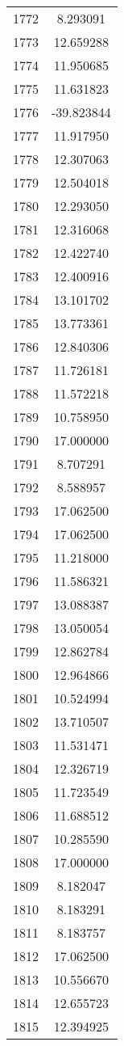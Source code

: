 \documentclass[12pt]{article}
\begin{document}
\begin{longtable}{@{}cc@{}}
1772 & 8.293091 \\
1773 & 12.659288 \\
1774 & 11.950685 \\
1775 & 11.631823 \\
1776 & -39.823844 \\
1777 & 11.917950 \\
1778 & 12.307063 \\
1779 & 12.504018 \\
1780 & 12.293050 \\
1781 & 12.316068 \\
1782 & 12.422740 \\
1783 & 12.400916 \\
1784 & 13.101702 \\
1785 & 13.773361 \\
1786 & 12.840306 \\
1787 & 11.726181 \\
1788 & 11.572218 \\
1789 & 10.758950 \\
1790 & 17.000000 \\
1791 & 8.707291 \\
1792 & 8.588957 \\
1793 & 17.062500 \\
1794 & 17.062500 \\
1795 & 11.218000 \\
1796 & 11.586321 \\
1797 & 13.088387 \\
1798 & 13.050054 \\
1799 & 12.862784 \\
1800 & 12.964866 \\
1801 & 10.524994 \\
1802 & 13.710507 \\
1803 & 11.531471 \\
1804 & 12.326719 \\
1805 & 11.723549 \\
1806 & 11.688512 \\
1807 & 10.285590 \\
1808 & 17.000000 \\
1809 & 8.182047 \\
1810 & 8.183291 \\
1811 & 8.183757 \\
1812 & 17.062500 \\
1813 & 10.556670 \\
1814 & 12.655723 \\
1815 & 12.394925 \\

\end{longtable}
\end{document}
